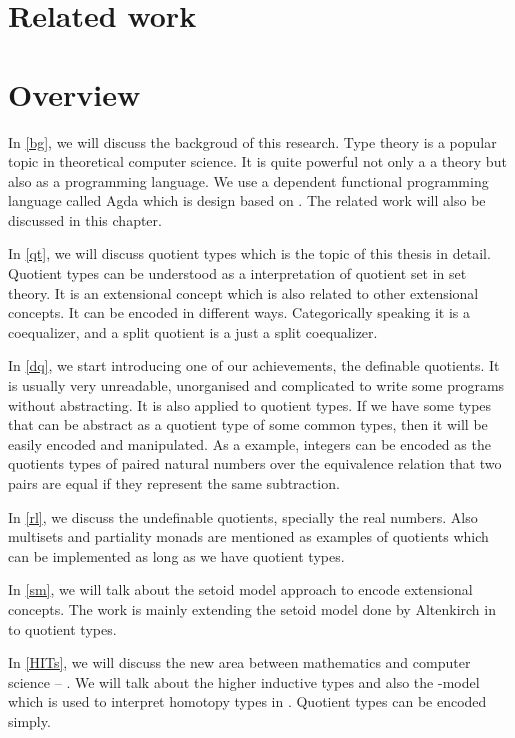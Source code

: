 \section{Related work}


\section{Overview}





In \autoref{bg}, we will discuss the backgroud of this research. Type theory is a popular topic in
theoretical computer science. It is quite powerful not only a a theory
but also as a programming language. We use a dependent functional
programming language called Agda which is design based on \mltt. The
 related work will also be discussed in this chapter.


In \autoref{qt}, we will discuss quotient types which is the topic of
this thesis in detail. Quotient types
can be understood as a interpretation of quotient set in set
theory. It is an extensional concept which is also related to other extensional concepts. It can be encoded in different ways. Categorically speaking it
is a coequalizer, and a split quotient is a just a split coequalizer.


In \autoref{dq}, we start introducing one of our achievements, the
definable quotients. It is usually very unreadable, unorganised and
complicated to write some programs without abstracting. It is also
applied to quotient types. If we have some types that can be abstract
as a quotient type of some common types, then it will be easily
encoded and manipulated. As a example, integers can be encoded as the
quotients types of paired natural numbers over the equivalence
relation that two pairs are equal if they represent the same
subtraction.

In \autoref{rl}, we discuss the undefinable quotients, specially the
real numbers. Also multisets and partiality monads are mentioned as
examples of quotients which can be implemented as long as we have
quotient types. 


In \autoref{sm}, we will talk about the setoid model approach to encode
extensional concepts. The work is mainly extending the setoid model
done by Altenkirch in \cite{alti:lics99} to
quotient types.


In \autoref{HITs}, we will discuss the new area between mathematics and
computer science -- \hott. We will talk about the higher inductive
types and also the \wog-model which is used to interpret
homotopy types in \itt. Quotient types can be encoded \hott simply.